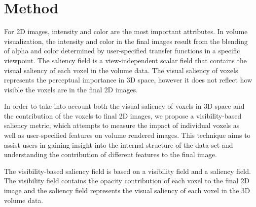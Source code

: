 


\section{Method}
For 2D images, intensity and color are the most important attributes. In volume visualization, the intensity and color in the final images result from the blending of alpha and color determined by user-specified transfer functions in a specific viewpoint.
The saliency field is a view-independent scalar field that contains the visual saliency of each voxel in the volume data. The visual saliency of voxels represents the perceptual importance in 3D space, however it does not reflect how visible the voxels are in the final 2D images.

In order to take into account both the visual saliency of voxels in 3D space and the contribution of the voxels to final 2D images, we propose a visibility-based saliency metric, which attempts to measure the impact of individual voxels as well as user-specified features on volume rendered images.
This technique aims to assist users in gaining insight into the internal structure of the data set and understanding the contribution of different features to the final image.

The visibility-based saliency field is based on a visibility field and a saliency field. The visibility field contains the opacity contribution of each voxel to the final 2D image and the saliency field represents the visual saliency of each voxel in the 3D volume data.

